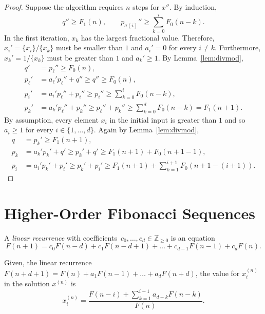 \begin{proof}
  Suppose the algorithm requires $n$ steps for $x''$.
  By induction,
  \[
    q'' ≥ F_1(n),
    \qquad
    p_{σ(i)}'' ≥ ∑_{k=0}^i F_0(n - k).
  \]
  In the first iteration,
  $x_k$ has the largest fractional value.
  Therefore, $x_i' = \{x_i\}/\{x_k\}$ must be smaller than $1$ and $a_i' = 0$ for every $i ≠ k$.
  Furthermore, $x_k' = 1/\{x_k\}$ must be greater than $1$ and $a_k' ≥ 1$.
  By Lemma~\ref{lem:divmod},
  \begin{align*}
    q' & = p_ℓ'' ≥ F_0(n), \\
    p_ℓ' & = a_ℓ' p_ℓ'' + q'' ≥ q'' ≥ F_0(n), \\
    p_i' & = a_i' p_ℓ'' + p_i'' ≥ p_i'' ≥ \sum_{k=0}^i F_0(n - k), \\
    p_k' & = a_k' p_ℓ'' + p_k'' ≥ p_ℓ'' + p_k'' ≥ \sum_{k=0}^d F_0(n - k) = F_1(n+1).
  \end{align*}
  By assumption, every element $x_i$ in the initial input is greater than $1$ and
  so $a_i ≥ 1$ for every $i ∈ \{1, …, d\}$.
  Again by Lemma~\ref{lem:divmod},
  \begin{align*}
    q & = p_k' ≥ F_1(n + 1), \\
    p_k & = a_k' p_k' + q' ≥ p_k' + q' ≥ F_1(n+1) + F_0(n + 1 - 1), \\
    p_i & = a_i' p_k' + p_i' ≥ p_k' + p_i' ≥ F_1(n+1) + \sum_{k=1}^{i+1} F_0(n+1 - (i+1)).
  \end{align*}
\end{proof}


\section{Higher-Order Fibonacci Sequences}


%
%


\begin{definition}
  A \emph{linear recurrence} with coefficients~$c_0, \dots, c_d ∈ ℤ_{≥ 0}$ is an equation
  \[
    F(n + 1) = c_0 F(n - d) + c_1 F(n - d + 1) + \dots + c_{d-1} F(n - 1) + c_d F(n).
  \]
\end{definition}

Given, the linear recurrence $F(n + d + 1) = F(n) + a_1 F(n - 1) + \dots + a_d F(n + d)$,
the value for $x_i^{(n)}$ in the solution $x^{(n)}$ is
\begin{equation}
  \label{eq:general-solution}
  x_i^{(n)} = \frac{F(n - i) + \sum_{k=1}^{i-1} a_{d-k} F(n - k)}{F(n)}.
\end{equation}

